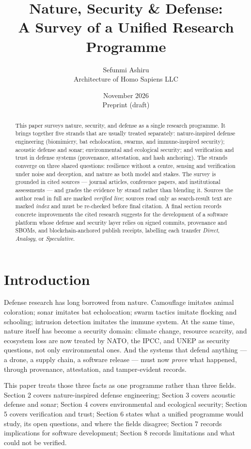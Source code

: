 \documentclass[11pt]{article}
\title{Nature, Security \& Defense:\\A Survey of a Unified Research Programme}
\author{Sefunmi Ashiru\\Architecture of Homo Sapiens LLC}
\date{November 2026\\Preprint (draft)}
\begin{document}
\maketitle

\begin{abstract}
This paper surveys nature, security, and defense as a single research
programme. It brings together five strands that are usually treated
separately: nature-inspired defense engineering (biomimicry, bat
echolocation, swarms, and immune-inspired security); acoustic defense
and sonar; environmental and ecological security; and verification and
trust in defense systems (provenance, attestation, and hash anchoring).
The strands converge on three shared questions: resilience without a
centre, sensing and verification under noise and deception, and nature
as both model and stakes. The survey is grounded in cited sources ---
journal articles, conference papers, and institutional assessments ---
and grades the evidence by strand rather than blending it. Sources the
author read in full are marked \emph{verified live}; sources read only
as search-result text are marked \emph{index} and must be re-checked
before final citation. A final section records concrete improvements
the cited research suggests for the development of a software platform
whose defense and security layer relies on signed commits, provenance
and SBOMs, and blockchain-anchored publish receipts, labelling each
transfer \emph{Direct}, \emph{Analogy}, or \emph{Speculative}.
\end{abstract}

\section{Introduction}

Defense research has long borrowed from nature. Camouflage imitates
animal coloration; sonar imitates bat echolocation; swarm tactics
imitate flocking and schooling; intrusion detection imitates the
immune system. At the same time, nature itself has become a security
domain: climate change, resource scarcity, and ecosystem loss are now
treated by NATO, the IPCC, and UNEP as security questions, not only
environmental ones. And the systems that defend anything --- a drone, a
supply chain, a software release --- must now \emph{prove} what
happened, through provenance, attestation, and tamper-evident records.

This paper treats those three facts as one programme rather than three
fields. Section 2 covers nature-inspired defense engineering;
Section 3 covers acoustic defense and sonar; Section 4 covers
environmental and ecological security; Section 5 covers verification
and trust; Section 6 states what a unified programme would study, its
open questions, and where the fields disagree; Section 7 records
implications for software development; Section 8 records limitations
and what could not be verified.
\end{document}
